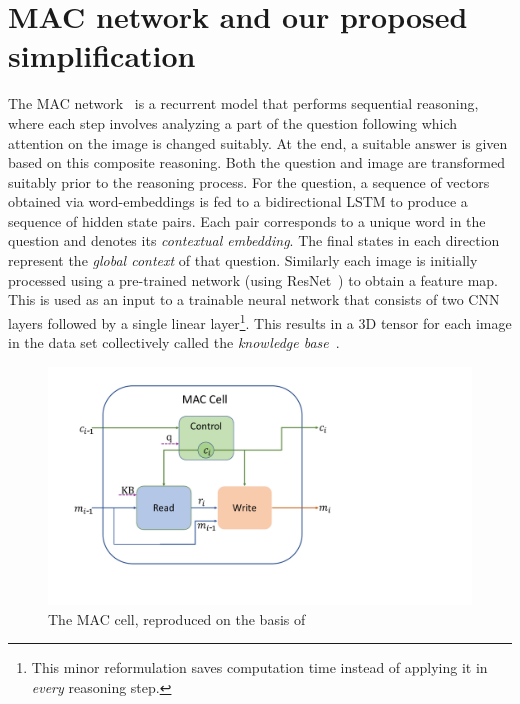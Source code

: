 \section{MAC network and our proposed simplification}

The MAC network~\cite{hudson2018compositional} is a recurrent model that performs
sequential reasoning, where each step involves analyzing a part of the question following 
which attention on the image is changed suitably.
At the end, a suitable answer is given based on this composite reasoning.
Both the question and image are transformed suitably prior to the reasoning process. 
For the question, a sequence of vectors obtained via word-embeddings is fed
to a bidirectional LSTM to produce a sequence of hidden state pairs. Each pair 
corresponds to a unique word in the question and denotes its 
\emph{contextual embedding}. The final states in each direction 
represent the \emph{global context} of that question.
Similarly each image is initially processed using a pre-trained network (using ResNet~\cite{he2016resnet}) to obtain a feature map. 
This is used as an input to a trainable neural network that consists of 
two CNN layers followed by a single linear layer\footnote{%
This minor reformulation saves computation time instead of applying it
in \emph{every} reasoning step.}.
This results in a 3D tensor for each image in the data set collectively called the
\emph{knowledge base}~\cite{hudson2018compositional}.

\begin{figure}
	\vspace{-15pt}
	\centering
	\includegraphics[width=\textwidth]{img/mac_cell.pdf}
	\caption{The MAC cell, reproduced on the basis of~\cite{hudson2018compositional}}
	\label{fig:mac_cell}
	\vspace{-5pt}
\end{figure}
	
